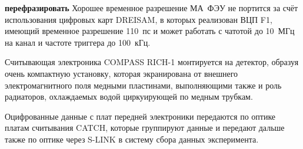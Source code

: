 
\todo \textbf{перефразировать}
Хорошее временное разрешение МА~ФЭУ не портится за счёт использования цифровых карт DREISAM, в которых реализован ВЦП F1, имеющий временное разрешение 110~пс и может работать с чатотой до 10~МГц на канал и частоте триггера до 100~кГц.


Считывающая электроника COMPASS \mbox{RICH-1} монтируется на детектор, образуя очень компактную установку, которая экранирована от внешнего электромагнитного поля медными пластинами, выполняющими также и роль радиаторов, охлаждаемых водой циркуирующей по медным трубкам.


Оцифрованные данные с плат передней электроники передаются по оптике платам считывания CATCH, которые группируют данные и передают дальше также по оптике через S-LINK в систему сбора данных эксперимента.


